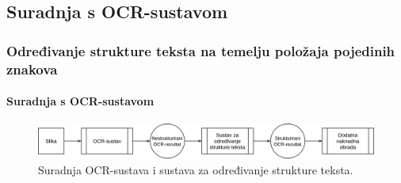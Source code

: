 \documentclass{beamer}
\begin{document}
\subsection{Suradnja s OCR-sustavom}
\begin{frame}
\frametitle{Određivanje strukture teksta na temelju položaja pojedinih znakova}
\framesubtitle{Suradnja s OCR-sustavom}
\begin{figure}[htb]
    \centering
    \includegraphics[width=\textwidth]{images/sustav-01.png}
    \caption{Suradnja OCR-sustava i sustava za određivanje strukture teksta.}
    \label{fig:sustav-01}
\end{figure}
\end{frame}
\end{document}
